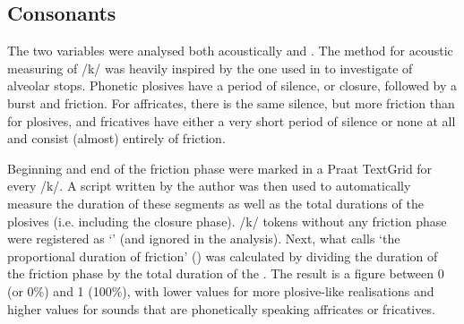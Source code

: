 		\subsection{Consonants}\label{sec.prod_method.con}

The two  variables were analysed both acoustically and .
The method for acoustic measuring of /k/ was heavily inspired by the one used in \citealt{sangster2001} to investigate  of alveolar stops. Phonetic plosives have a period of silence, or closure, followed by a burst and friction. For affricates, there is the same silence, but more friction than for plosives, and fricatives have either a very short period of silence or none at all and consist (almost) entirely of friction. 

Beginning and end of the friction phase were marked in a Praat TextGrid for every /k/. 
A script written by the author was then used to automatically measure the duration of these segments as well as the total durations of the plosives (i.e. including the closure phase).
/k/ tokens without any friction phase were registered as `' (and ignored in the analysis).
Next, what \citeauthor{sangster2001} calls `the proportional duration of friction' () was calculated by dividing the duration of the friction phase by the total duration of the . The result is a figure between 0 (or 0\%) and 1 (100\%), with lower values for more plosive-like realisations and higher values for sounds that are phonetically speaking affricates or fricatives.

